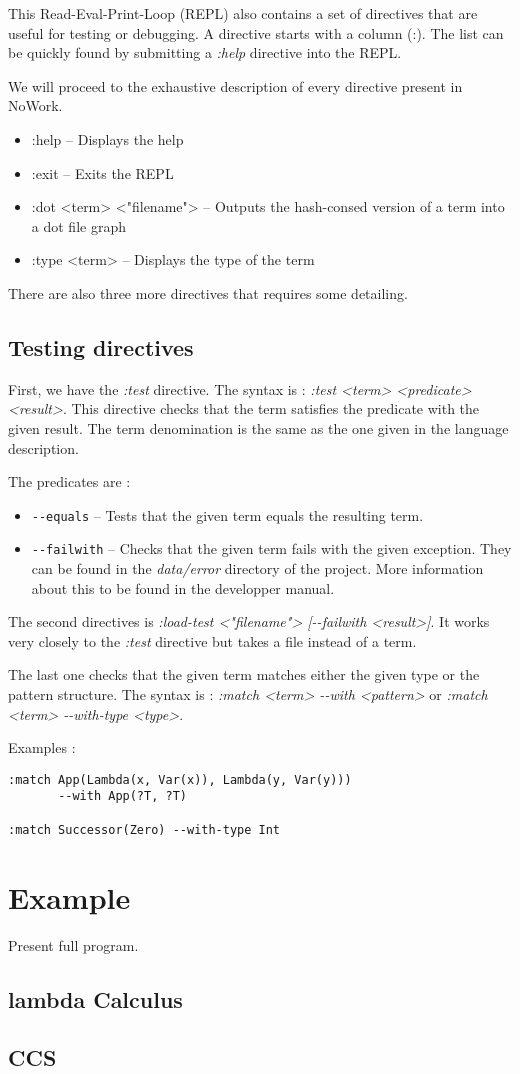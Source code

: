 \documentclass[12pt,a4paper]{article}
\begin{document}
This Read-Eval-Print-Loop (REPL) also contains a set of directives
that are useful for testing or debugging. A directive starts with a
column (:). The list can be quickly found by submitting a \emph{:help}
directive into the REPL.

We will proceed to the exhaustive description of every directive
present in NoWork.

\begin{itemize}
  \item :help -- Displays the help
  \item :exit -- Exits the REPL
  \item :dot <term> <"filename"> -- Outputs the hash-consed version of
    a term into a dot file graph
  \item :type <term> -- Displays the type of the term
\end{itemize}

There are also three more directives that requires some detailing.

\subsection{Testing directives}

First, we have the \emph{:test} directive. The syntax is : \emph{:test
  <term> <predicate> <result>}. This directive checks that the term
satisfies the predicate with the given result. The term denomination
is the same as the one given in the language description.

The predicates are : 
\begin{itemize}
\item \texttt{-{}-equals} -- Tests that the given term equals the resulting term.
\item \texttt{-{}-failwith} -- Checks that the given term fails with the
  given exception. They can be found in the \emph{data/error}
  directory of the project. More information about this to be found in
  the developper manual.
\end{itemize}

The second directives is \emph{:load-test <"filename"> [-{}-failwith
  <result>]}. It works very closely to the \emph{:test} directive but
takes a file instead of a term.

The last one checks that the given term matches either the given type
or the pattern structure. The syntax is : \emph{:match <term> -{}-with
  <pattern>} or \emph{:match <term> -{}-with-type <type>}.

Examples : 
\begin{verbatim}
:match App(Lambda(x, Var(x)), Lambda(y, Var(y))) 
       --with App(?T, ?T) 

:match Successor(Zero) --with-type Int
\end{verbatim}

\section{Example}
Present full program.

\subsection{lambda Calculus}

\subsection{CCS}
\end{document}
